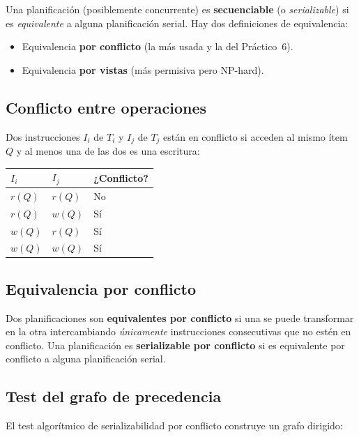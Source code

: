 \documentclass[11pt,a4paper]{article}
\begin{document}
Una planificación (posiblemente concurrente) es \textbf{secuenciable}
(o \emph{serializable}) si es \emph{equivalente} a alguna planificación
serial. Hay dos definiciones de equivalencia:

\begin{itemize}
    \item Equivalencia \textbf{por conflicto} (la más usada y la del
    Práctico~6).
    \item Equivalencia \textbf{por vistas} (más permisiva pero NP-hard).
\end{itemize}

\subsection{Conflicto entre operaciones}

Dos instrucciones $I_i$ de $T_i$ y $I_j$ de $T_j$ están en conflicto si
acceden al mismo ítem $Q$ y al menos una de las dos es una escritura:

\begin{center}
\begin{tabular}{lll}
\toprule
$I_i$ & $I_j$ & ¿Conflicto? \\
\midrule
$r(Q)$ & $r(Q)$ & No \\
$r(Q)$ & $w(Q)$ & Sí \\
$w(Q)$ & $r(Q)$ & Sí \\
$w(Q)$ & $w(Q)$ & Sí \\
\bottomrule
\end{tabular}
\end{center}

\subsection{Equivalencia por conflicto}

Dos planificaciones son \textbf{equivalentes por conflicto} si una se
puede transformar en la otra intercambiando \emph{únicamente}
instrucciones consecutivas que no estén en conflicto. Una planificación
es \textbf{serializable por conflicto} si es equivalente por conflicto
a alguna planificación serial.

\subsection{Test del grafo de precedencia}

El test algorítmico de serializabilidad por conflicto construye un grafo
dirigido:
\end{document}
